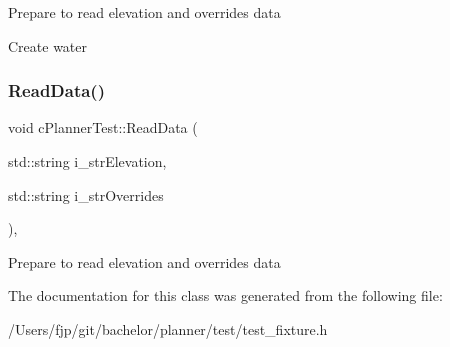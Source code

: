 Prepare to read elevation and overrides data

Create water \mbox{\label{classc_planner_test_af8a0f625c6cb4dffc1ea3182332e53c6}} 
\subsubsection{\texorpdfstring{Read\+Data()}{ReadData()}}
{\footnotesize\ttfamily void c\+Planner\+Test\+::\+Read\+Data (\begin{DoxyParamCaption}\item[{std\+::string}]{i\+\_\+str\+Elevation,  }\item[{std\+::string}]{i\+\_\+str\+Overrides }\end{DoxyParamCaption})\hspace{0.3cm}{\ttfamily [inline]}, {\ttfamily [protected]}}

Prepare to read elevation and overrides data 

The documentation for this class was generated from the following file\+:\begin{DoxyCompactItemize}
\item 
/\+Users/fjp/git/bachelor/planner/test/test\+\_\+fixture.\+h\end{DoxyCompactItemize}
